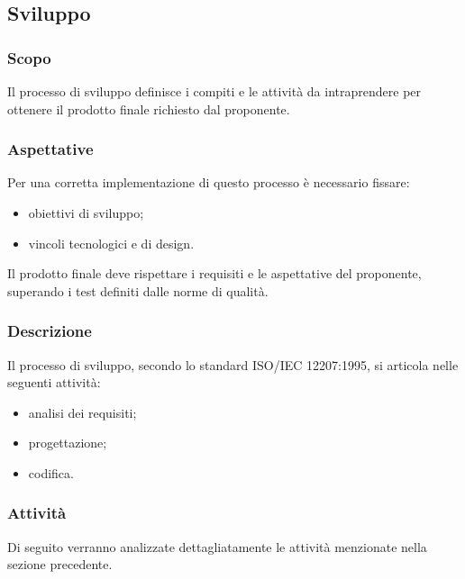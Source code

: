 \subsection{Sviluppo}
		\subsubsection{Scopo}
			Il processo di sviluppo definisce i compiti e le attività da intraprendere per ottenere il prodotto finale richiesto dal proponente.
		\subsubsection{Aspettative}
			Per una corretta implementazione di questo processo è necessario fissare:
				\begin{itemize}
					\item obiettivi di sviluppo;
					\item vincoli tecnologici e di design.
				\end{itemize}
			Il prodotto finale deve rispettare i requisiti e le aspettative del proponente, superando i test definiti dalle norme di qualità.
		\subsubsection{Descrizione}
			Il processo di sviluppo, secondo lo standard ISO/IEC 12207:1995, si articola nelle seguenti attività:
				\begin{itemize}
					\item analisi dei requisiti;
					\item progettazione;
					\item codifica.
				\end{itemize}

		\subsubsection{Attività}
			Di seguito verranno analizzate dettagliatamente le attività menzionate nella sezione precedente.
